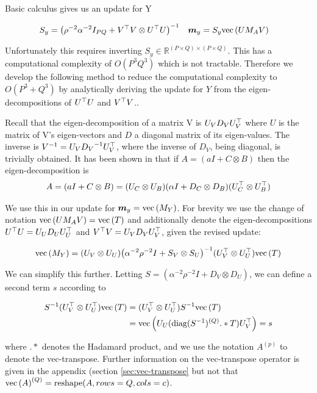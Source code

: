 Basic calculus gives us an update for Y

\begin{align}
S_y & = {\left( \rho^{-2} \alpha^{-2} I_{PQ} + V^\top V \otimes U^\top U \right)}^{-1}
&
\bm m_y & = S_y \text{vec}\left(U M_A V\right)
\end{align}

Unfortunately this requires inverting $S_y \in \mathbb{R}^{(P \times Q) \times (P \times Q)}$. This has a computational complexity of $O(P^3Q^3)$ which is not tractable. Therefore we develop the following method to reduce the computational complexity to $O(P^3 + Q^3)$ by analytically deriving the update for $Y$ from the eigen-decompositions of $U^\top U$ and $V^\top V$..

Recall that the eigen-decomposition of a matrix V is $U_V D_V U_V^\top$ where $U$ is the matrix of V's eigen-vectors and $D$ a diagonal matrix of its eigen-values. The inverse is ${V}^{-1} = U_V {D_V}^{-1} U_V^\top$, where the inverse of $D_V$, being diagonal, is trivially obtained. It has been shown in \cite{Stegle2011} that if $A = (a I + C \otimes B)$ then the eigen-decomposition is
\begin{align}
A = (a I + C \otimes B) = (U_C \otimes U_B)(\alpha I + D_C \otimes D_B)(U_C^\top \otimes U_B^\top)
\end{align}

We use this in our update for $\bm m_y = \text{vec}\left(M_Y\right)$. For brevity we use the change of notation $\text{vec}\left(U M_A V\right) = \text{vec}\left(T\right)$ and additionally denote the eigen-decompositions $U^\top U = U_U D_U U_U^\top$ and $V^\top V = U_V D_V U_V^\top$, given the revised update:

\begin{align}
\text{vec}\left(M_Y\right) = (U_V \otimes U_U)
  {\left( \alpha^{-2}\rho^{-2} I + S_V \otimes S_U \right)}^{-1}
  (U_V^\top \otimes U_U^\top) \text{vec}\left(T\right)
\end{align}

We can simplify this further. Letting $S = (\alpha^{-2}\rho^{-2} I + D_V \otimes D_U)$, we can define a second term $s$ according to

\begin{align}
S^{-1}(U_V^\top \otimes U_U^\top) \text{vec}\left(T\right) 
& =
(U_V^\top \otimes U_U^\top)S^{-1} \text{vec}\left(T\right) \\
& =
\text{vec}\left(U_U (\text{diag}(S^{-1})^{(Q)} .* T) U_V^\top\right) = s
\end{align}

where $.*$ denotes the Hadamard product, and we use the notation $A^{(p)}$ to denote the vec-transpose\cite{Minka2000a}. Further information on the vec-transpose operator is given in the appendix (section \ref{sec:vec-transpose} but not that $\text{vec}\left(A\right)^{(Q)} = \text{reshape}(A, rows=Q, cols=c)$.

